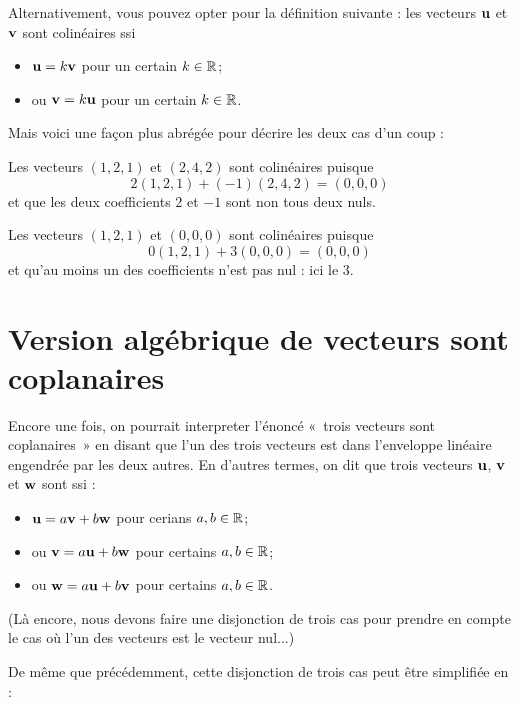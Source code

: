 Alternativement, vous pouvez opter pour la définition suivante : les vecteurs $\mathbf{u}$ et $\mathbf{v}$ sont colinéaires ssi 
\begin{itemize}
\item $\mathbf{u} = k \mathbf{v}$ pour un certain $k\in \mathbb{R}$;
\item ou $\mathbf{v} = k \mathbf{u}$ pour un certain $k\in \mathbb{R}$.
\end{itemize}
Mais voici une façon plus abr\'eg\'ee pour décrire les deux cas d'un coup :



\begin{myexample}
Les vecteurs $(1,2,1)$ et $(2,4,2)$ sont colinéaires puisque
$$
2(1,2,1) + (-1)(2,4,2) = (0,0,0)
$$
et que les deux coefficients $2$ et $-1$ sont non tous deux nuls.
\end{myexample}

\begin{myexample} Les vecteurs $(1,2,1)$ et $(0,0,0)$ sont colinéaires puisque
$$
0(1,2,1) + 3(0,0,0)= (0,0,0)
$$
et qu'au moins un des coefficients n'est pas nul : ici le $3$. 
\end{myexample}

\section{Version algébrique de \texorpdfstring{ vecteurs sont coplanaires \fg}{3 vecteurs sont coplanaires}}

Encore une fois, on pourrait interpreter l'énoncé «~trois vecteurs sont coplanaires~» en disant que l'un des trois vecteurs
est dans l'enveloppe lin\'eaire engendr\'ee par les deux autres.  En d'autres termes, on dit que trois vecteurs
$\mathbf{u}$, $\mathbf{v}$ et $\mathbf{w}$ sont  ssi :
\begin{itemize}
\item $\mathbf{u} = a\mathbf{v}+b\mathbf{w}$ pour cerians $a,b\in \mathbb{R}$;
\item ou $\mathbf{v} = a\mathbf{u} + b\mathbf{w}$ pour certains $a,b\in \mathbb{R}$;
\item ou $\mathbf{w} = a\mathbf{u} + b\mathbf{v}$ pour certains $a,b\in \mathbb{R}$.
\end{itemize}
(Là encore, nous devons faire une disjonction de trois cas pour prendre en compte le cas où
l'un des vecteurs est le vecteur nul...)

De même que précédemment, cette disjonction de trois cas peut être simplifiée en :

